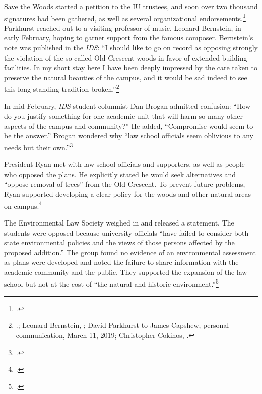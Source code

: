 \documentclass[
  american,
  letterpaper,
]{scrreprt}
\begin{document}
Save the Woods started a petition to the IU trustees, and soon over two
thousand signatures had been gathered, as well as several organizational
endorsements.\footnote{.} Parkhurst reached out to a
visiting professor of music, Leonard Bernstein, in early February,
hoping to garner support from the famous composer. Bernstein's note was
published in the \emph{IDS}: ``I should like to go on record as opposing
strongly the violation of the so-called Old Crescent woods in favor of
extended building facilities. In my short stay here I have been deeply
impressed by the care taken to preserve the natural beauties of the
campus, and it would be sad indeed to see this long-standing tradition
broken.''\footnote{{.}; Leonard
  Bernstein, ; David
  Parkhurst to James Capshew, personal communication, March 11, 2019;
  Christopher Cokinos, .}

In mid-February, \emph{IDS} student columnist Dan Brogan admitted
confusion: ``How do you justify something for one academic unit that
will harm so many other aspects of the campus and community?'' He added,
``Compromise would seem to be the answer.'' Brogan wondered why ``law
school officials seem oblivious to any needs but their own.''\footnote{.}

President Ryan met with law school officials and supporters, as well as
people who opposed the plans. He explicitly stated he would seek
alternatives and ``oppose removal of trees'' from the Old Crescent. To
prevent future problems, Ryan supported developing a clear policy for
the woods and other natural areas on campus.\footnote{.}

The Environmental Law Society weighed in and released a statement. The
students were opposed because university officials ``have failed to
consider both state environmental policies and the views of those
persons affected by the proposed addition.'' The group found no evidence
of an environmental assessment as plans were developed and noted the
failure to share information with the academic community and the public.
They supported the expansion of the law school but not at the cost of
``the natural and historic environment.''\footnote{.}
\end{document}
